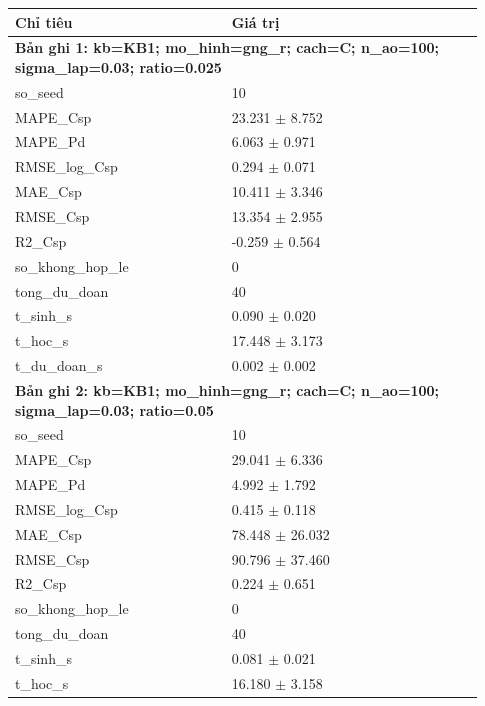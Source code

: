 \begin{longtable}{p{0.43\linewidth}p{0.50\linewidth}}
\toprule Chỉ tiêu & Giá trị \\ \midrule \endhead
\multicolumn{2}{p{0.95\linewidth}}{\textbf{Bản ghi 1: kb=KB1; mo\_hinh=gng\_r; cach=C; n\_ao=100; sigma\_lap=0.03; ratio=0.025}} \\
so\_\allowbreak seed & 10 \\
MAPE\_\allowbreak Csp & 23.231 $\pm$ 8.752 \\
MAPE\_\allowbreak Pd & 6.063 $\pm$ 0.971 \\
RMSE\_\allowbreak log\_\allowbreak Csp & 0.294 $\pm$ 0.071 \\
MAE\_\allowbreak Csp & 10.411 $\pm$ 3.346 \\
RMSE\_\allowbreak Csp & 13.354 $\pm$ 2.955 \\
R2\_\allowbreak Csp & -0.259 $\pm$ 0.564 \\
so\_\allowbreak khong\_\allowbreak hop\_\allowbreak le & 0 \\
tong\_\allowbreak du\_\allowbreak doan & 40 \\
t\_\allowbreak sinh\_\allowbreak s & 0.090 $\pm$ 0.020 \\
t\_\allowbreak hoc\_\allowbreak s & 17.448 $\pm$ 3.173 \\
t\_\allowbreak du\_\allowbreak doan\_\allowbreak s & 0.002 $\pm$ 0.002 \\
\midrule
\multicolumn{2}{p{0.95\linewidth}}{\textbf{Bản ghi 2: kb=KB1; mo\_hinh=gng\_r; cach=C; n\_ao=100; sigma\_lap=0.03; ratio=0.05}} \\
so\_\allowbreak seed & 10 \\
MAPE\_\allowbreak Csp & 29.041 $\pm$ 6.336 \\
MAPE\_\allowbreak Pd & 4.992 $\pm$ 1.792 \\
RMSE\_\allowbreak log\_\allowbreak Csp & 0.415 $\pm$ 0.118 \\
MAE\_\allowbreak Csp & 78.448 $\pm$ 26.032 \\
RMSE\_\allowbreak Csp & 90.796 $\pm$ 37.460 \\
R2\_\allowbreak Csp & 0.224 $\pm$ 0.651 \\
so\_\allowbreak khong\_\allowbreak hop\_\allowbreak le & 0 \\
tong\_\allowbreak du\_\allowbreak doan & 40 \\
t\_\allowbreak sinh\_\allowbreak s & 0.081 $\pm$ 0.021 \\
t\_\allowbreak hoc\_\allowbreak s & 16.180 $\pm$ 3.158 \\

\end{longtable}
